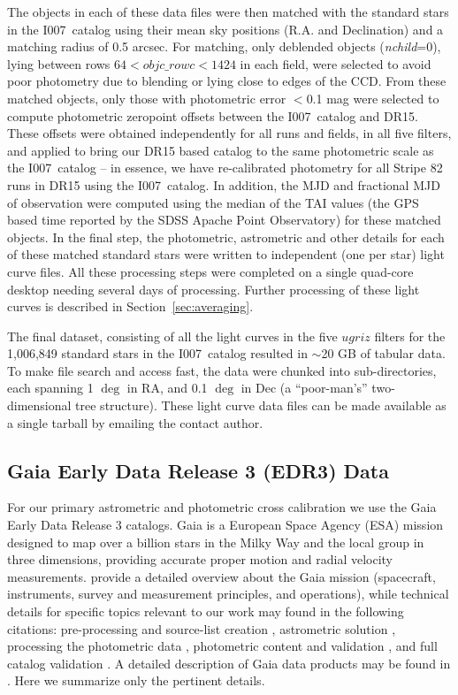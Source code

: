 \documentclass[fleqn,usenatbib]{mnras}
\newcommand{\pO}{\hbox{I007}}
\begin{document}
The objects in each of these data files were then matched with the standard stars in the \pO\ catalog using their mean sky positions (R.A. and Declination) and a matching radius of 0.5 arcsec. For matching, only deblended objects ({\it nchild}=0), lying between rows $64 < objc\_rowc < 1424$ in each field, were selected to avoid poor photometry due to blending or lying close to edges of the CCD. From these matched objects, only those with photometric error $<$0.1 mag were selected to compute photometric zeropoint offsets between the \pO\ catalog and DR15. These offsets were obtained independently for all runs and fields, in all five filters, and applied to bring our DR15 based catalog to the same photometric scale as the \pO\ catalog -- in essence, we have re-calibrated photometry for all Stripe 82 runs in DR15 using the \pO\ catalog. In addition, the MJD and fractional MJD of observation were computed using the median of the TAI values (the GPS based time reported by the SDSS Apache Point Observatory) for these matched objects. In the final step, the photometric, astrometric and other details for each of these matched standard stars were written to independent (one per star) light curve files. All these processing steps were completed on a single quad-core desktop needing several days of processing. Further processing of these light curves is described in Section~\ref{sec:averaging}. 

The final dataset, consisting of all the light curves in the five $ugriz$ filters for the 1,006,849 standard stars in the \pO\ catalog resulted in $\sim$20 GB of tabular data. To make file search and access fast, the data were chunked into sub-directories, each spanning 1 $\deg$ in RA, and 0.1 $\deg$ in Dec (a ``poor-man's'' two-dimensional tree structure). These light curve data files can be made available as a single tarball by emailing the contact author. 

\subsection{Gaia Early Data Release 3 (EDR3) Data} \label{ssec:gaia}
 
For our primary astrometric and photometric cross calibration we use the Gaia Early Data Release 3 catalogs.  Gaia is a European Space Agency (ESA) mission designed to map over a billion stars in the Milky Way and the local group in three dimensions, providing accurate proper motion and radial velocity measurements. \citet{GaiaCollab2016} provide a detailed overview about the Gaia mission (spacecraft, instruments, survey and measurement principles, and operations), while technical details for specific topics relevant to our work may found in the following citations: pre-processing and source-list creation \citep{Fabr2016}, astrometric solution \citep{LInd2018}, processing the photometric data \citep{Riel2018}, photometric content and validation \citep{Evan2018}, and full catalog validation \citep{Aren2018}. A detailed description of Gaia data products  
may be found in \citet{GaiaCollab2018b}. Here we summarize only the pertinent details.
\end{document}
